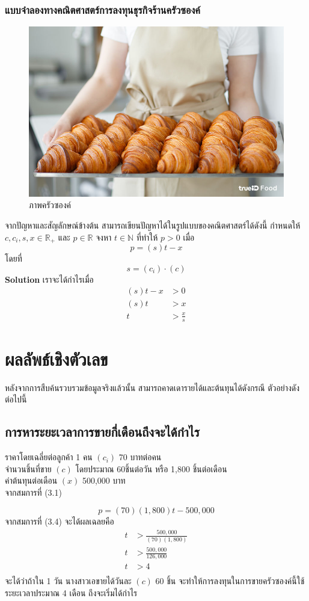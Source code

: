 \documentclass{report}
\begin{document}
\subsection{แบบจำลองทางคณิตศาสตร์การลงทุนธุรกิจร้านครัวซองค์}
\begin{figure}[!h]
	\centering
	\includegraphics[scale=0.2]{DD.jpg}
	\caption{ภาพครัวซองค์ \cite{POPO}}
	\label{fig:graph3}
\end{figure}
จากปัญหาและสัญลักษณ์ข้างต้น สามารถเขียนปัญหาได้ในรูปแบบของคณิตศาสตร์ได้ดังนี้
กำหนดให้ ${c,c_i,s,x}\in\mathbb{R_{+}}$ และ ${p}\in\mathbb{R}$ จงหา 
${t}\in\mathbb{N}$ 
ที่ทำให้ $p>0$ เมื่อ
\begin{equation}
	p = (s)t - x 
\end{equation}
โดยที่ 
	$$s = (c_i)\cdot (c)$$
\textbf{Solution} เราจะได้กำไรเมื่อ
\begin{align}
(s)t - x &> 0 \\
(s)t &> x \\
t &>\frac{x}{s}
\end{align}


\chapter{ผลลัพธ์เชิงตัวเลข}
หลังจากการสืบค้นรวบรวมข้อมูลจริงแล้วนั้น สามารถคาดเดารายได้และต้นทุนได้ดังกรณี
ตัวอย่างดังต่อไปนี้
\section{การหาระยะเวลาการขายกี่เดือนถึงจะได้กำไร}
ราคาโดยเฉลี่ยต่อลูกค้า 1 คน $(c_i)$ 70 บาทต่อคน \\
จำนวนชิ้นที่ขาย $(c)$ โดยประมาณ 60ชิ้นต่อวัน หรือ 1,800 ชิ้นต่อเดือน \\
ค่าต้นทุนต่อเดือน $(x)$ 500,000 บาท \\
จากสมการที่ (3.1)\par 
\begin{equation} 
	p = (70)(1,800)t - 500,000 
\end{equation}
จากสมการที่ (3.4) จะได้ผลเฉลยคือ
\begin{align*}
t &> \frac{500,000}{(70)(1,800)} \\
t &> \frac{500,000}{126,000} \\
t &> 4 \\
\end{align*}
จะได้ว่าถ้าใน 1 วัน นางสาวเอขายได้วันละ $(c)$ 60 ชิ้น จะทำให้การลงทุนในการขายครัวซองค์นี้ใช้ระยะเวลาประมาณ 4 เดือน ถึงจะเริ่มได้กำไร
\end{document}
